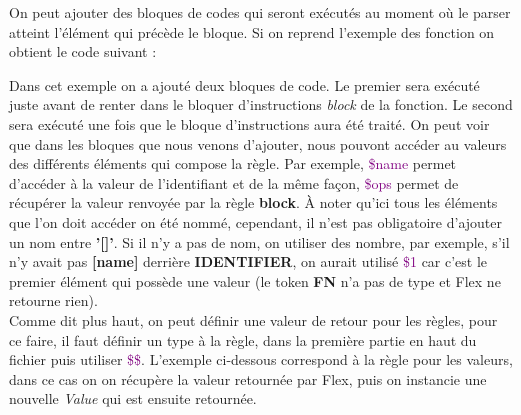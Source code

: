\documentclass[a4paper]{article}%
\begin{document}
On peut ajouter des bloques de codes qui seront exécutés au moment où le
\gls{parser}
atteint l'élément qui précède le bloque. Si on reprend l'exemple des fonction on
obtient le code suivant :

\leavevmode\newline

Dans cet exemple on a ajouté deux bloques de code. Le premier sera exécuté juste
avant de renter dans le bloquer d'instructions \textit{block} de la fonction. Le
second sera exécuté une fois que le bloque d'instructions aura été traité. On
peut voir que dans les bloques que nous venons d'ajouter, nous pouvont accéder
au valeurs des différents éléments qui compose la règle. Par exemple,
\textcolor{purple}{\$name} permet d'accéder à la valeur de l'identifiant et de la
même façon, \textcolor{purple}{\$ops} permet de récupérer la valeur renvoyée par
la règle \textbf{block}. À noter qu'ici tous les éléments que l'on doit accéder
on été nommé, cependant, il n'est pas obligatoire d'ajouter un nom entre
\textbf{'[]'}. Si il n'y a pas de nom, on utiliser des nombre, par exemple, s'il
n'y avait pas \textbf{[name]} derrière \textbf{IDENTIFIER}, on aurait utilisé
\textcolor{purple}{\$1} car c'est le premier élément qui possède une valeur (le
token \textbf{FN} n'a pas de type et Flex ne retourne rien).\\


Comme dit plus haut, on peut définir une valeur de retour pour les règles, pour
ce faire, il faut définir un type à la règle, dans la première partie en haut du
fichier puis utiliser \textcolor{purple}{\$\$}. L'exemple ci-dessous correspond
à la règle pour les valeurs, dans ce cas on on récupère la valeur retournée par
Flex, puis on instancie une nouvelle \textit{Value} qui est ensuite retournée.

\leavevmode\newline
\end{document}
